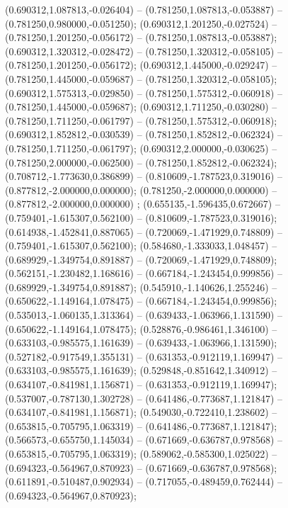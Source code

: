  (0.690312,1.087813,-0.026404) -- (0.781250,1.087813,-0.053887) -- (0.781250,0.980000,-0.051250);
 (0.690312,1.201250,-0.027524) -- (0.781250,1.201250,-0.056172) -- (0.781250,1.087813,-0.053887);
 (0.690312,1.320312,-0.028472) -- (0.781250,1.320312,-0.058105) -- (0.781250,1.201250,-0.056172);
 (0.690312,1.445000,-0.029247) -- (0.781250,1.445000,-0.059687) -- (0.781250,1.320312,-0.058105);
 (0.690312,1.575313,-0.029850) -- (0.781250,1.575312,-0.060918) -- (0.781250,1.445000,-0.059687);
 (0.690312,1.711250,-0.030280) -- (0.781250,1.711250,-0.061797) -- (0.781250,1.575312,-0.060918);
 (0.690312,1.852812,-0.030539) -- (0.781250,1.852812,-0.062324) -- (0.781250,1.711250,-0.061797);
 (0.690312,2.000000,-0.030625) -- (0.781250,2.000000,-0.062500) -- (0.781250,1.852812,-0.062324);
 (0.708712,-1.773630,0.386899) -- (0.810609,-1.787523,0.319016) -- (0.877812,-2.000000,0.000000);
 (0.781250,-2.000000,0.000000) -- (0.877812,-2.000000,0.000000) ;
 (0.655135,-1.596435,0.672667) -- (0.759401,-1.615307,0.562100) -- (0.810609,-1.787523,0.319016);
 (0.614938,-1.452841,0.887065) -- (0.720069,-1.471929,0.748809) -- (0.759401,-1.615307,0.562100);
 (0.584680,-1.333033,1.048457) -- (0.689929,-1.349754,0.891887) -- (0.720069,-1.471929,0.748809);
 (0.562151,-1.230482,1.168616) -- (0.667184,-1.243454,0.999856) -- (0.689929,-1.349754,0.891887);
 (0.545910,-1.140626,1.255246) -- (0.650622,-1.149164,1.078475) -- (0.667184,-1.243454,0.999856);
 (0.535013,-1.060135,1.313364) -- (0.639433,-1.063966,1.131590) -- (0.650622,-1.149164,1.078475);
 (0.528876,-0.986461,1.346100) -- (0.633103,-0.985575,1.161639) -- (0.639433,-1.063966,1.131590);
 (0.527182,-0.917549,1.355131) -- (0.631353,-0.912119,1.169947) -- (0.633103,-0.985575,1.161639);
 (0.529848,-0.851642,1.340912) -- (0.634107,-0.841981,1.156871) -- (0.631353,-0.912119,1.169947);
 (0.537007,-0.787130,1.302728) -- (0.641486,-0.773687,1.121847) -- (0.634107,-0.841981,1.156871);
 (0.549030,-0.722410,1.238602) -- (0.653815,-0.705795,1.063319) -- (0.641486,-0.773687,1.121847);
 (0.566573,-0.655750,1.145034) -- (0.671669,-0.636787,0.978568) -- (0.653815,-0.705795,1.063319);
 (0.589062,-0.585300,1.025022) -- (0.694323,-0.564967,0.870923) -- (0.671669,-0.636787,0.978568);
 (0.611891,-0.510487,0.902934) -- (0.717055,-0.489459,0.762444) -- (0.694323,-0.564967,0.870923);
